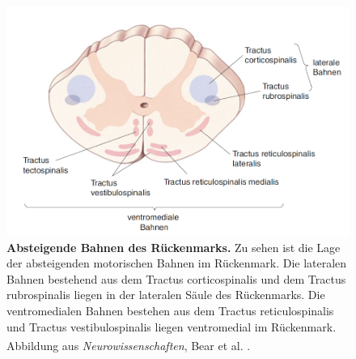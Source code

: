 \documentclass[12pt,a4paper,pdftex]{article}
\begin{document}
\begin{figure}[H]
    \centering
    \includegraphics[width=1\textwidth]{pictures/Bilder_Laura/absteigende_bahnen_rkm.png}
    \caption[Absteigende Bahnen des Rückenmarks]{\textbf{Absteigende Bahnen des Rückenmarks.} Zu sehen ist die Lage der absteigenden motorischen Bahnen im Rückenmark. Die lateralen Bahnen bestehend aus dem Tractus corticospinalis und dem Tractus rubrospinalis liegen in der lateralen Säule des Rückenmarks. Die ventromedialen Bahnen bestehen aus dem Tractus reticulospinalis und Tractus vestibulospinalis liegen ventromedial im Rückenmark. \\
    Abbildung aus \textit{Neurowissenschaften}, Bear et al. \textsuperscript{\cite[14]{neurowissenschaften_baer}}.}
    \label{fig:abst_Rueckenmark}
\end{figure}
\end{document}

